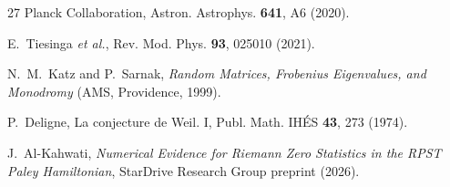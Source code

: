 \documentclass[prd,twocolumn,amsmath,amssymb]{revtex4-2}
\begin{document}
\begin{thebibliography}{27}
Planck Collaboration, Astron. Astrophys. \textbf{641}, A6 (2020).

E.~Tiesinga \textit{et al.}, Rev. Mod. Phys. \textbf{93}, 025010 (2021).

N.~M.~Katz and P.~Sarnak, \textit{Random Matrices, Frobenius Eigenvalues,
and Monodromy} (AMS, Providence, 1999).

P.~Deligne, La conjecture de Weil. I, Publ. Math. IHÉS \textbf{43}, 273 (1974).

J.~Al-Kahwati, \textit{Numerical Evidence for Riemann Zero Statistics in the
RPST Paley Hamiltonian}, StarDrive Research Group preprint (2026).

\end{thebibliography}
\end{document}
